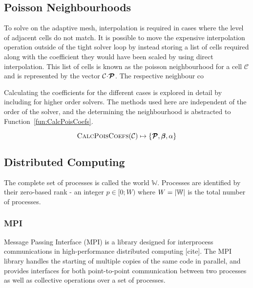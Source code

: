 \documentclass[twoside]{IIBproject}
\newcommand{\vect} [1] {\bm{#1}}
\newcommand{\acc}{{\mkern 0.5mu\cdot\mkern 0.5mu}}
\numberwithin{figure}{section}
\begin{document}


    \subsection{Poisson Neighbourhoods} %
        \label{sec:poissonneighbours}

        To solve on the adaptive mesh, interpolation is required in cases where the level of adjacent cells do not match. It is possible to move the expensive interpolation operation outside of the tight solver loop by instead storing a list of cells required along with the coefficient they would have been scaled by using direct interpolation. This list of cells is known as the poisson neighbourhood for a cell $\mathcal{C}$ and is represented by the vector $\mathcal{C}\acc\vect{\mathcal{P}}$. The respective neighbour co

        Calculating the coefficients for the different cases is explored in detail by \cite{Yung2010} including for higher order solvers. The methods used here are independent of the order of the solver, and the determining the neighbourhood is abstracted to Function~\ref{fun:CalcPoisCoefs}.

        \begin{equation}
            \label{fun:CalcPoisCoefs}
            \textproc{CalcPoisCoefs}(\mathcal{C}) \mapsto \{ \vect{\mathcal{P}}, \vect{\beta}, \alpha \}
        \end{equation}



    \subsection{Distributed Computing} %
        \label{sec:computing}

        The complete set of processes is called the world $\mathbb{W}$. Processes are identified by their zero-based rank - an integer $p \in [0;W)$ where $W=\abs{\mathbb{W}}$ is the total number of processes. 

        \subsubsection{MPI} %
            \label{sec:mpi}

            Message Passing Interface (MPI) is a library designed for interprocess communications in high-performance distributed computing [cite]. The MPI library handles the starting of multiple copies of the same code in parallel, and provides interfaces for both point-to-point communication between two processes as well as collective operations over a set of processes.
\end{document}
